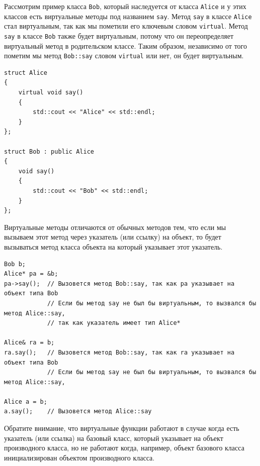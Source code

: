 \documentclass{article}
\begin{document}
Рассмотрим пример класса \texttt{Bob}, который наследуется от класса \texttt{Alice} и у этих классов есть виртуальные методы под названием \texttt{say}. Метод \texttt{say} в классе \texttt{Alice} стал виртуальным, так как мы пометили его ключевым словом \texttt{virtual}. Метод \texttt{say} в классе \texttt{Bob} также будет виртуальным, потому что он переопределяет виртуальный метод в родительском классе. Таким образом, независимо от того пометим мы метод \texttt{Bob::say} словом \texttt{virtual} или нет, он будет виртуальным.


\begin{lstlisting}[style=csMiptCppBorderStyle]
struct Alice 
{
    virtual void say() 
    {
    	std::cout << "Alice" << std::endl;
    }
};

struct Bob : public Alice 
{
    void say() 
    {
    	std::cout << "Bob" << std::endl;
    }
};
\end{lstlisting}
Виртуальные методы отличаются от обычных методов тем, что если мы вызываем этот метод через указатель (или ссылку) на объект, то будет вызываться метод класса объекта на который указывает этот указатель.
\begin{lstlisting}[style=csMiptCppBorderStyle]
Bob b;
Alice* pa = &b;
pa->say();  // Вызовется метод Bob::say, так как pa указывает на объект типа Bob
            // Если бы метод say не был бы виртуальным, то вызвался бы метод Alice::say,
            // так как указатель имеет тип Alice*
            
Alice& ra = b;
ra.say();   // Вызовется метод Bob::say, так как ra указывает на объект типа Bob
            // Если бы метод say не был бы виртуальным, то вызвался бы метод Alice::say,
            
Alice a = b;
a.say();    // Вызовется метод Alice::say
\end{lstlisting}



\noindent Обратите внимание, что виртуальные функции работают в случае когда есть указатель (или ссылка) на базовый класс, который указывает на объект производного класса, но не работают когда, например, объект базового класса инициализирован объектом производного класса.

\newpage
\end{document}
